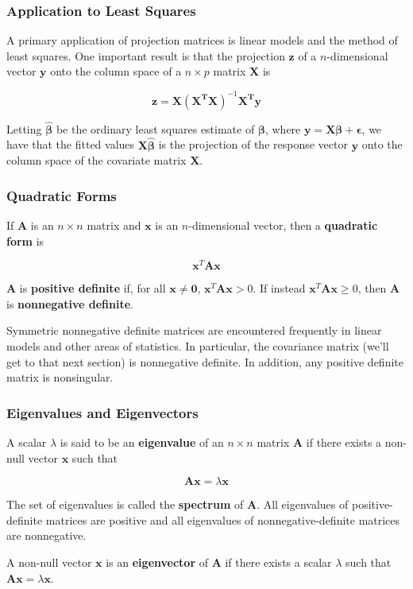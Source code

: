 \documentclass{beamer}
\begin{document}
\begin{frame}
\frametitle{Application to Least Squares}
A primary application of projection matrices is linear models and the method of least squares.  One important result is that the projection $\mathbf{z}$ of a $n$-dimensional vector $\mathbf{y}$ onto the column space of a $n \times p$ matrix $\mathbf{X}$ is

\[\mathbf{z} = \mathbf{X(X^TX)}^{-1}\mathbf{X^Ty}\]

Letting $\mathbf{\hat{\beta}}$ be the ordinary least squares estimate of $\mathbf{\beta}$, where $\mathbf{y} = \mathbf{X\beta} + \mathbf{\epsilon}$, we have that the fitted values $\mathbf{X}\hat{\mathbf{\beta}}$ is the projection of the response vector $\mathbf{y}$ onto the column space of the covariate matrix $\mathbf{X}$.
\end{frame}

\begin{frame}
\frametitle{Quadratic Forms}
If $\mathbf{A}$ is an $n \times n$ matrix and $\mathbf{x}$ is an $n$-dimensional vector, then a \textbf{quadratic form} is 

\[\mathbf{x}^T\mathbf{Ax}\]

$\mathbf{A}$ is \textbf{positive definite} if, for all $\mathbf{x} \neq \mathbf{0}$, $\mathbf{x}^T\mathbf{Ax} > 0$.  If instead $\mathbf{x}^T\mathbf{Ax} \geq 0$, then $\mathbf{A}$ is \textbf{nonnegative definite}.
\vspace{5mm}

Symmetric nonnegative definite matrices are encountered frequently in linear models and other areas of statistics.  In particular, the covariance matrix (we'll get to that next section) is nonnegative definite.  In addition, any positive definite matrix is nonsingular.
\end{frame}

\begin{frame}
\frametitle{Eigenvalues and Eigenvectors}
A scalar $\lambda$ is said to be an \textbf{eigenvalue} of an $n \times n$ matrix $\mathbf{A}$ if there exists a non-null vector $\mathbf{x}$ such that

\[\mathbf{Ax} = \lambda\mathbf{x}\]

The set of eigenvalues is called the \textbf{spectrum} of $\mathbf{A}$.  All eigenvalues of positive-definite matrices are positive and all eigenvalues of nonnegative-definite matrices are nonnegative. 
\vspace{5mm}

 A non-null vector $\mathbf{x}$ is an \textbf{eigenvector} of $\mathbf{A}$ if there exists a scalar $\lambda$ such that $\mathbf{Ax} = \lambda\mathbf{x}$.
\end{frame}
\end{document}
